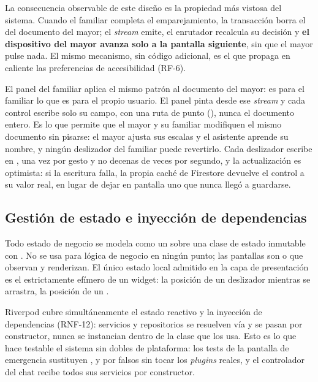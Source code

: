 La consecuencia observable de este diseño es la propiedad más vistosa del sistema. Cuando el familiar
completa el emparejamiento, la transacción borra el  del documento del mayor; el
\emph{stream} emite, el enrutador recalcula su decisión y \textbf{el dispositivo del mayor avanza solo a la
pantalla siguiente}, sin que el mayor pulse nada. El mismo mecanismo, sin código adicional, es el que
propaga en caliente las preferencias de accesibilidad (RF-6).

El panel del familiar aplica el mismo patrón al documento del mayor:  es para el
familiar lo que  es para el propio usuario. El panel pinta desde ese \emph{stream}
y cada control escribe solo su campo, con una ruta de punto (), nunca el documento
entero. Es lo que permite que el mayor y su familiar modifiquen el mismo documento sin pisarse: el mayor
ajusta sus escalas y el asistente aprende su nombre, y ningún deslizador del familiar puede revertirlo. Cada
deslizador escribe en , una vez por gesto y no decenas de veces por segundo, y la
actualización es optimista: si la escritura falla, la propia caché de Firestore devuelve el control a su
valor real, en lugar de dejar en pantalla uno que nunca llegó a guardarse.

\subsection{Gestión de estado e inyección de dependencias}

Todo estado de negocio se modela como un  sobre una clase de estado inmutable con
. No se usa  para lógica de negocio en ningún punto; las pantallas son
 o  que observan y renderizan. El único estado local
admitido en la capa de presentación es el estrictamente efímero de un widget: la posición de un
deslizador mientras se arrastra, la posición de un .

Riverpod cubre simultáneamente el estado reactivo y la inyección de dependencias (RNF-12): servicios y
repositorios se resuelven vía  y se pasan por constructor, nunca se instancian dentro de la
clase que los usa. Esto es lo que hace testable el sistema sin dobles de plataforma: los tests de la
pantalla de emergencia sustituyen ,  y  por
falsos sin tocar los \emph{plugins} reales, y el controlador del chat recibe todos sus servicios por
constructor.

